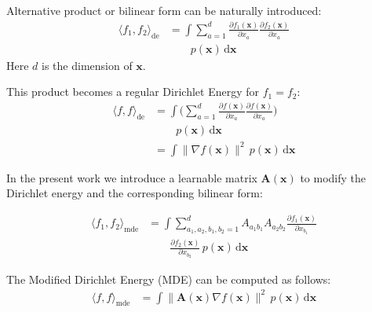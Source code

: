 \documentclass{article}
\theoremstyle{plain}
\theoremstyle{definition}
\theoremstyle{remark}
\begin{document}
Alternative product or bilinear form can be naturally introduced:
\begin{equation}
    \label{eq:bilinear_form_1_original}
    \begin{split}
    \langle f_1, f_2 \rangle_{\text{de}}
    &= \int \sum_{a=1}^{d}
       \frac{\partial f_1(\mathbf{x})}{\partial x_a}
       \frac{\partial f_2(\mathbf{x})}{\partial x_a} \\
    &\qquad p(\mathbf{x}) \,\mathrm{d}\mathbf{x}
    \end{split}
\end{equation}
Here $d$ is the dimension of $\mathbf{x}$.


This product becomes a regular Dirichlet Energy for $f_1 = f_2$:
\begin{equation}
    \label{eq:dirichlet_energy_original}
    \begin{split}
    \langle f, f \rangle_{\text{de}}
    &= \int \biggl(
         \sum_{a=1}^{d}
         \frac{\partial f(\mathbf{x})}{\partial x_a}
         \frac{\partial f(\mathbf{x})}{\partial x_a}
       \biggr) \\
    &\qquad p(\mathbf{x}) \,\mathrm{d}\mathbf{x} \\
    &= \int \lVert \nabla f(\mathbf{x}) \rVert^2\, p(\mathbf{x}) \,\mathrm{d}\mathbf{x}
    \end{split}
\end{equation}

In the present work we introduce a learnable matrix $\mathbf{A}(\mathbf{x})$ to modify the Dirichlet energy and the corresponding
bilinear form:

\begin{equation}
    \label{eq:bilinear_form_1}
    \begin{split}
    \langle f_1, f_2 \rangle_{\text{mde}}
    &= \int \sum_{a_1, a_2, b_1, b_2=1}^{d}
       A_{a_1 b_1} A_{a_2 b_2}
       \frac{\partial f_1(\mathbf{x})}{\partial x_{b_1}} \\
    &\qquad
       \frac{\partial f_2(\mathbf{x})}{\partial x_{b_2}}
       \, p(\mathbf{x}) \,\mathrm{d}\mathbf{x}
    \end{split}
\end{equation}

The Modified Dirichlet Energy (MDE) can be computed as follows:
\begin{equation}
    \label{eq:dirichlet_energy}
    \begin{split}
    \langle f, f \rangle_{\text{mde}}
    &= \int \bigl\lVert \mathbf{A}(\mathbf{x})\nabla f(\mathbf{x}) \bigr\rVert^2
       \, p(\mathbf{x}) \,\mathrm{d}\mathbf{x}
    \end{split}
\end{equation}
\end{document}
